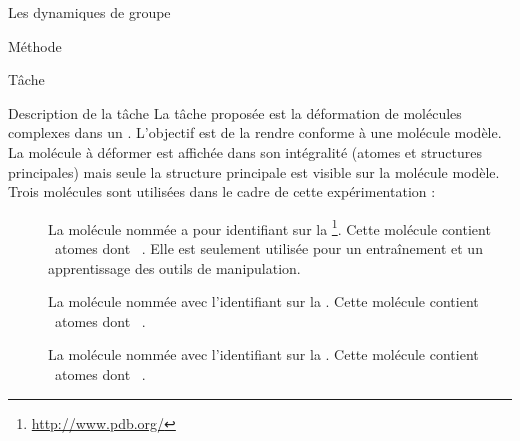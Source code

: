 \documentclass[myfrancais]{mythesis}
\begin{document}
\begin{mychapter}{Les dynamiques de groupe}
\begin{mysection}{Méthode}
\begin{mysubsection}{Tâche}
\begin{mysubsubsection}{Description de la tâche}
					La tâche proposée est la déformation de molécules complexes dans un .
					L'objectif est de la rendre conforme à une molécule modèle.
					La molécule à déformer est affichée dans son intégralité (atomes et structures principales) mais seule la structure principale est visible sur la molécule modèle.
					Trois molécules sont utilisées dans le cadre de cette expérimentation :
					\begin{description}
						\item[\myTRPCAGE]
							La molécule nommée \myTRPCAGE {} a pour identifiant \myPDB {} sur la \myPDBbase\footnote{\url{http://www.pdb.org/}}.
							Cette molécule contient ~atomes dont ~.
							Elle est seulement utilisée pour un entraînement et un apprentissage des outils de manipulation.
						\item[\myPrion]
							La molécule nommée \myPrion {} avec l'identifiant \myPDB {} sur la \myPDBbase\footnotemark[\value{footnote}].
							Cette molécule contient ~atomes dont ~.
						\item[\myUbiquitin]
							La molécule nommée \myUbiquitin {} avec l'identifiant \myPDB {} sur la \myPDBbase\footnotemark[\value{footnote}].
							Cette molécule contient ~atomes dont ~.
					\end{description}


\end{mysubsubsection}
\end{mysubsection}
\end{mysection}
\end{mychapter}
\end{document}
